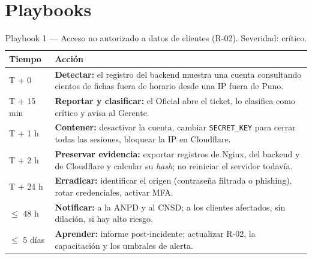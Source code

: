 \section{Playbooks}

\begin{table}[H]
\centering
\caption{Playbook 1 --- Acceso no autorizado a datos de clientes (R-02). Severidad: crítico.}
\label{tab:anx-inc-pb1}
\small
\begin{tabularx}{\textwidth}{L{1.6cm}X}
\toprule
\textbf{Tiempo} & \textbf{Acción} \\
\midrule
T + 0 & \textbf{Detectar:} el registro del backend muestra una cuenta consultando cientos de fichas fuera de horario desde una IP fuera de Puno. \\
T + 15 min & \textbf{Reportar y clasificar:} el Oficial abre el ticket, lo clasifica como crítico y avisa al Gerente. \\
T + 1 h & \textbf{Contener:} desactivar la cuenta, cambiar \texttt{SECRET\_KEY} para cerrar todas las sesiones, bloquear la IP en Cloudflare. \\
T + 2 h & \textbf{Preservar evidencia:} exportar registros de Nginx, del backend y de Cloudflare y calcular su \emph{hash}; no reiniciar el servidor todavía. \\
T + 24 h & \textbf{Erradicar:} identificar el origen (contraseña filtrada o phishing), rotar credenciales, activar MFA. \\
$\leq$ 48 h & \textbf{Notificar:} a la ANPD y al CNSD; a los clientes afectados, sin dilación, si hay alto riesgo. \\
$\leq$ 5 días & \textbf{Aprender:} informe post-incidente; actualizar R-02, la capacitación y los umbrales de alerta. \\
\bottomrule
\end{tabularx}
\end{table}

